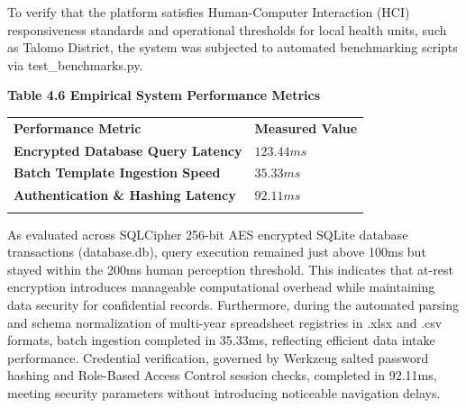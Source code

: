 \documentclass[
]{article}
\newcounter{none} %
\begin{document}
To verify that the platform satisfies Human-Computer Interaction (HCI)
responsiveness standards and operational thresholds for local health
units, such as Talomo District, the system was subjected to automated
benchmarking scripts via test\_benchmarks.py.

\textbf{Table 4.6 Empirical System Performance Metrics}

{\def\LTcaptype{none} %
\begin{longtable}[]{@{}
  >{\raggedright\arraybackslash}p{}
  >{\raggedright\arraybackslash}p{}@{}}
\toprule\noalign{}
\begin{minipage}[b]{\linewidth}\raggedright
\textbf{Performance Metric}
\end{minipage} & \begin{minipage}[b]{\linewidth}\raggedright
\textbf{Measured Value}
\end{minipage} \\
\begin{minipage}[b]{\linewidth}\raggedright
\textbf{Encrypted Database Query Latency}
\end{minipage} & \begin{minipage}[b]{\linewidth}\raggedright
\(123.44ms\)
\end{minipage} \\
\begin{minipage}[b]{\linewidth}\raggedright
\textbf{Batch Template Ingestion Speed}
\end{minipage} & \begin{minipage}[b]{\linewidth}\raggedright
\(35.33ms\)
\end{minipage} \\
\begin{minipage}[b]{\linewidth}\raggedright
\textbf{Authentication \& Hashing Latency}
\end{minipage} & \begin{minipage}[b]{\linewidth}\raggedright
\(92.11ms\)
\end{minipage} \\
\midrule\noalign{}
\endhead
\bottomrule\noalign{}
\endlastfoot
\end{longtable}
}

As evaluated across SQLCipher 256-bit AES encrypted SQLite database
transactions (database.db), query execution remained just above 100ms
but stayed within the 200ms human perception threshold. This indicates
that at-rest encryption introduces manageable computational overhead
while maintaining data security for confidential records. Furthermore,
during the automated parsing and schema normalization of multi-year
spreadsheet registries in .xlsx and .csv formats, batch ingestion
completed in 35.33ms, reflecting efficient data intake performance.
Credential verification, governed by Werkzeug salted password hashing
and Role-Based Access Control session checks, completed in 92.11ms,
meeting security parameters without introducing noticeable navigation
delays.
\end{document}
